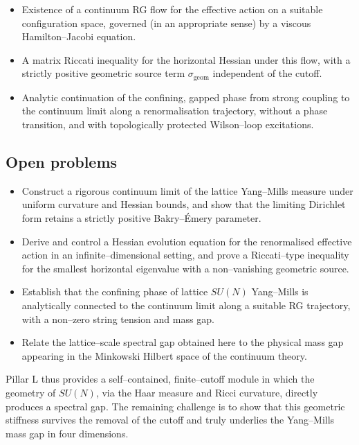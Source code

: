 \documentclass[11pt]{article}
\numberwithin{equation}{section}
\begin{document}
\begin{itemize}
  \item Existence of a continuum RG flow for the effective action on a
  suitable configuration space, governed (in an appropriate sense) by a
  viscous Hamilton--Jacobi equation.

  \item A matrix Riccati inequality for the horizontal Hessian under
  this flow, with a strictly positive geometric source term
  $\sigma_{\mathrm{geom}}$ independent of the cutoff.

  \item Analytic continuation of the confining, gapped phase from
  strong coupling to the continuum limit along a renormalisation
  trajectory, without a phase transition, and with topologically
  protected Wilson--loop excitations.
\end{itemize}

\subsection*{Open problems}

\begin{itemize}
  \item Construct a rigorous continuum limit of the lattice Yang--Mills
  measure under uniform curvature and Hessian bounds, and show that the
  limiting Dirichlet form retains a strictly positive Bakry--\'Emery
  parameter.

  \item Derive and control a Hessian evolution equation for the
  renormalised effective action in an infinite--dimensional setting, and
  prove a Riccati--type inequality for the smallest horizontal
  eigenvalue with a non--vanishing geometric source.

  \item Establish that the confining phase of lattice $SU(N)$
  Yang--Mills is analytically connected to the continuum limit along a
  suitable RG trajectory, with a non--zero string tension and mass gap.

  \item Relate the lattice--scale spectral gap obtained here to the
  physical mass gap appearing in the Minkowski Hilbert space of the
  continuum theory.
\end{itemize}

Pillar L thus provides a self--contained, finite--cutoff module in which
the geometry of $SU(N)$, via the Haar measure and Ricci curvature,
directly produces a spectral gap.  The remaining challenge is to show
that this geometric stiffness survives the removal of the cutoff and
truly underlies the Yang--Mills mass gap in four dimensions.
\end{document}
